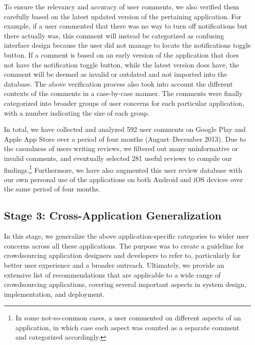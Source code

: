 \documentclass[conference,10pt]{IEEEtran}
\begin{document}
To ensure the relevancy and accuracy of user comments, we also verified them carefully based on the latest updated version of the pertaining application. For example, if a user commented that there was no way to turn off notifications but there actually was, this comment will instead be categorized as confusing interface design because the user did not manage to locate the notifications toggle button. If a comment is based on an early version of the application that does not have the notification toggle button, while the latest version does have, the comment will be deemed as invalid or outdated and not imported into the database. The above verification process also took into account the different contexts of the comments in a case-by-case manner. The comments were finally categorized into broader groups of user concerns for each particular application, with a number indicating the size of each group. 

In total, we have collected and analyzed 592 user comments on Google Play and Apple App Store over a period of four months (August--December 2013). Due to the casualness of users writing reviews, we filtered out many uninformative or invalid comments, and eventually selected 281 useful reviews to compile our findings.\footnote{In some not-so-common cases, a user commented on different aspects of an application, in which case each aspect was counted as a separate comment and categorized accordingly.} Furthermore, we have also augmented this user review database with our own personal use of the applications on both Android and iOS devices over the same period of four months.

\subsection{Stage 3: Cross-Application Generalization}

In this stage, we generalize the above application-specific categories to wider user concerns across all these applications. The purpose was to create a guideline for crowdsourcing application designers and developers to refer to, particularly for better user experience and a broader outreach. Ultimately, we provide an extensive list of recommendations that are applicable to a wide range of crowdsourcing applications, covering several important aspects in system design, implementation, and deployment.
\end{document}
